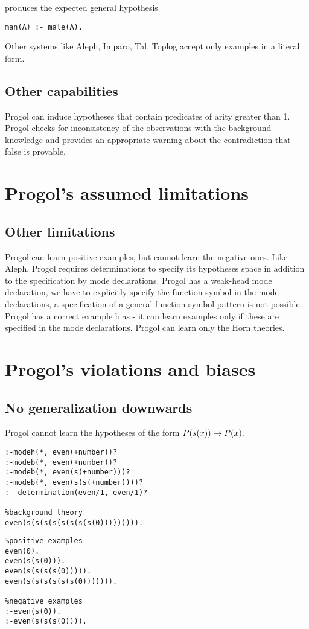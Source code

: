 produces the expected general hypothesis
\begin{lstlisting}
man(A) :- male(A).
\end{lstlisting}

Other systems like Aleph, Imparo, Tal, Toplog accept only examples in a literal form.

\subsection{Other capabilities}
Progol can induce hypotheses that contain predicates of arity greater than 1. Progol checks for inconsistency of the observations with the background knowledge and provides an appropriate warning about the contradiction that false is provable.

\section{Progol's assumed limitations}

\subsection{Other limitations}
Progol can learn positive examples, but cannot learn the negative ones. Like Aleph, Progol requires determinations to specify its hypotheses space in addition to the specification by mode declarations. Progol has a weak-head mode declaration, we have to explicitly specify the function symbol in the mode declarations, a specification of a general function symbol pattern is not possible. Progol has a correct example bias - it can learn examples only if these are specified in the mode declarations. Progol can learn only the Horn theories.

\section{Progol's violations and biases}
\subsection{No generalization downwards}
Progol cannot learn the hypotheses of the form $P(s(x)) \to P(x)$.

\begin{minipage}[t]{.60\textwidth}
\begin{lstlisting}
:-modeh(*, even(+number))?
:-modeb(*, even(+number))?
:-modeb(*, even(s(+number)))?
:-modeb(*, even(s(s(+number))))?
:- determination(even/1, even/1)?

%background theory
even(s(s(s(s(s(s(s(s(0))))))))).
\end{lstlisting}
\end{minipage}
\begin{minipage}[t]{.20\textwidth}
\begin{lstlisting}
%positive examples
even(0).
even(s(s(0))).
even(s(s(s(s(0))))).
even(s(s(s(s(s(s(0))))))).

%negative examples
:-even(s(0)).
:-even(s(s(s(0)))).
\end{lstlisting}
\end{minipage}

